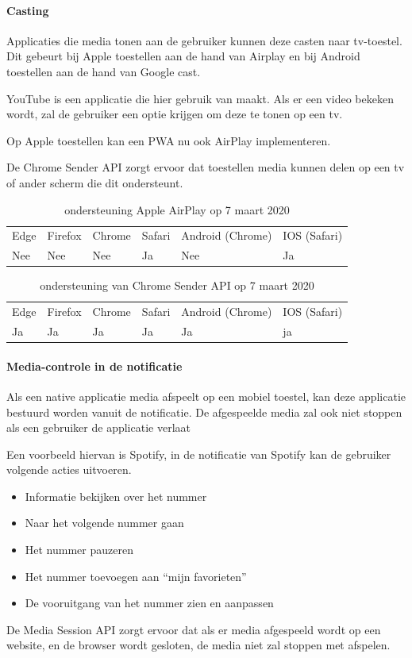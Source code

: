 \paragraph{Casting}

Applicaties die media tonen aan de gebruiker kunnen deze casten naar tv-toestel. Dit gebeurt bij Apple toestellen aan de hand van Airplay en bij Android toestellen aan de hand van Google cast.

YouTube is een applicatie die hier gebruik van maakt. Als er een video bekeken wordt, zal de gebruiker een optie krijgen om deze te tonen op een tv.

Op Apple toestellen kan een PWA nu ook AirPlay implementeren. 
\autocite{Apple2020a}

De Chrome Sender API \autocite{Developers2020b} zorgt ervoor dat toestellen media kunnen delen op een tv of ander scherm die dit ondersteunt.

\begin{table}[H]
	\centering
	\begin{tabular}{llllll}
		Edge & Firefox & Chrome & Safari & Android (Chrome) & IOS (Safari) \\
		Nee   & Nee      & Nee     & Ja     & Nee               & Ja          
	\end{tabular}	
	\caption{ondersteuning Apple AirPlay op 7 maart 2020}
\end{table}
\begin{table}[H]
	\centering
	\begin{tabular}{llllll}
		Edge & Firefox & Chrome & Safari & Android (Chrome) & IOS (Safari) \\
		Ja   & Ja      & Ja     & Ja     & Ja               & ja          
	\end{tabular}	
	\caption{ondersteuning van Chrome Sender API op 7 maart 2020}
\end{table}




\paragraph{Media-controle in de notificatie }


Als een native applicatie media afspeelt op een mobiel toestel, kan deze applicatie bestuurd worden vanuit de notificatie. De afgespeelde media zal ook niet stoppen als een gebruiker de applicatie verlaat

Een voorbeeld hiervan is Spotify, in de notificatie van Spotify kan de gebruiker volgende acties uitvoeren.
 \begin{itemize}
   \item	Informatie bekijken over het nummer
   \item	Naar het volgende nummer gaan
   \item	Het nummer pauzeren
   \item	Het nummer toevoegen aan “mijn favorieten”
   \item	De vooruitgang van het nummer zien en aanpassen
\end{itemize}
De Media Session API \autocite{Beaufort2019} zorgt ervoor dat als er media afgespeeld wordt op een website, en de browser wordt gesloten, de media niet zal stoppen met afspelen.

